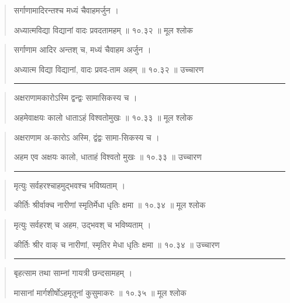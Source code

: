 \begin{quotation} 

सर्गाणामादिरन्तश्च मध्यं चैवाहमर्जुन  ।  

अध्यात्मविद्या विद्यानां वादः प्रवदतामहम्‌  ॥ १०.३२ ॥  मूल श्लोक
\end{quotation}

\begin{quotation}

सर्गाणाम आदिर अन्तश् च, मध्यं चैवाहम अर्जुन  ।  

अध्यात्म विद्या विद्यानां, वादः प्रवद-ताम अहम्‌  ॥ १०.३२ ॥  उच्चारण

\noindent\rule{16cm}{0.4pt} 
\end{quotation}


\begin{quotation} 

अक्षराणामकारोऽस्मि द्वन्द्वः सामासिकस्य च ।  

अहमेवाक्षयः कालो धाताऽहं विश्वतोमुखः  ॥ १०.३३ ॥  मूल श्लोक
\end{quotation}

\begin{quotation}

अक्षराणाम अ-कारोऽ अस्मि, द्वंद्वः सामा-सिकस्य च  ।  

अहम एव अक्षयः कालो, धाताहं विश्वतो मुखः  ॥ १०.३३ ॥  उच्चारण

\noindent\rule{16cm}{0.4pt} 
\end{quotation}


\begin{quotation} 

मृत्युः सर्वहरश्चाहमुद्भवश्च भविष्यताम्‌  ।  

कीर्तिः श्रीर्वाक्च नारीणां स्मृतिर्मेधा धृतिः क्षमा  ॥ १०.३४ ॥  मूल श्लोक
\end{quotation}

\begin{quotation}

मृत्युः सर्वहरश् च अहम, उद्भवश् च भविष्यताम्‌  ।  

कीर्तिः श्रीर वाक् च नारीणां, स्मृतिर मेधा धृतिः क्षमा  ॥ १०.३४ ॥  उच्चारण

\noindent\rule{16cm}{0.4pt} 
\end{quotation}


\begin{quotation} 

बृहत्साम तथा साम्नां गायत्री छन्दसामहम्‌  ।  

मासानां मार्गशीर्षोऽहमृतूनां कुसुमाकरः ॥ १०.३५ ॥  मूल श्लोक
\end{quotation}

